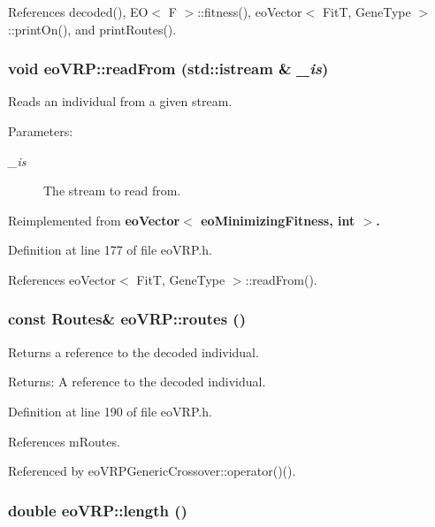 References decoded(), EO$<$ F $>$::fitness(), eo\-Vector$<$ Fit\-T, Gene\-Type $>$::print\-On(), and print\-Routes().
\subsubsection{\setlength{\rightskip}{0pt plus 5cm}void eo\-VRP::read\-From (std::istream \& {\em \_\-is})\hspace{0.3cm}{\tt  [inline, virtual]}}\label{classeo_v_r_p_fdb87ffaf7ac95988e8896bb896183cc}


Reads an individual from a given stream. 

\begin{Desc}
\item[Parameters:]
\begin{description}
\item[{\em \_\-is}]The stream to read from. \end{description}
\end{Desc}


Reimplemented from \bf{eo\-Vector$<$ eo\-Minimizing\-Fitness, int $>$}.

Definition at line 177 of file eo\-VRP.h.

References eo\-Vector$<$ Fit\-T, Gene\-Type $>$::read\-From().
\subsubsection{\setlength{\rightskip}{0pt plus 5cm}const Routes\& eo\-VRP::routes ()\hspace{0.3cm}{\tt  [inline]}}\label{classeo_v_r_p_0e000044813b4ebdd822e7e2f8540d8b}


Returns a reference to the decoded individual. 

\begin{Desc}
\item[Returns:]A reference to the decoded individual. \end{Desc}


Definition at line 190 of file eo\-VRP.h.

References m\-Routes.

Referenced by eo\-VRPGeneric\-Crossover::operator()().
\subsubsection{\setlength{\rightskip}{0pt plus 5cm}double eo\-VRP::length ()\hspace{0.3cm}{\tt  [inline]}}\label{classeo_v_r_p_e4d189ca6349a875ae8d6fd9c7fe2491}


